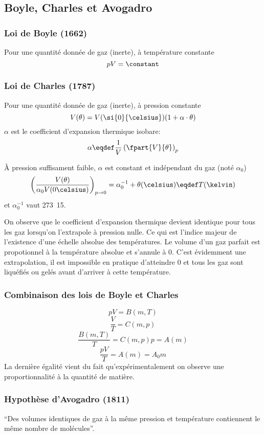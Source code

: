 \subsection{Boyle, Charles et Avogadro}
\subsubsection{Loi de Boyle (1662)}
Pour une quantité donnée de gaz (inerte), à température constante
\[ pV = \constant \]

\subsubsection{Loi de Charles (1787)}
Pour une quantité donnée de gaz (inerte), à pression constante
\[ V(\theta) = V(\si{0}{\celsius})(1 + \alpha \cdot \theta) \]
$\alpha$ est le coefficient d'expansion thermique isobare:
\[ \alpha \eqdef
\frac{1}{V}\left(\fpart{V}{\theta}\right)_p \]

À pression suffisament faible,
$\alpha$ est constant et indépendant du gaz (noté $\alpha_0$)
\[ \left(\frac{V(\theta)}{\alpha_0 V(0\celsius)}\right)_{p\rightarrow 0} =
\alpha_0^{-1}+\theta(\celsius) \eqdef T(\kelvin) \]
et $\alpha_0^{-1}$ vaut \si{273.15}{\celsius}.

On observe que le coefficient d'expansion thermique devient identique
pour tous les gaz lorsqu'on l'extrapole à pression nulle.
Ce qui est l'indice majeur de l'existence
d'une échelle absolue des températures.
Le volume d'un gaz parfait est propotionnel à la température absolue et
s'annule à \si{0}{\kelvin}.
C'est évidemment une extrapolation, il est impossible en pratique d'atteindre
\si{0}{\kelvin} et tous les gaz sont liquéfiés ou
gelés avant d'arriver à cette température.

\subsubsection{Combinaison des lois de Boyle et Charles}
\[ pV = B(m,T) \]
\[ \frac{V}{T} = C(m,p) \]
\[ \frac{B(m,T)}{T} = C(m,p)p = A(m) \]
\[ \frac{pV}{T} = A(m) = A_0m \]
La dernière égalité vient du fait qu'expérimentalement on observe
une proportionnalité à la quantité de matière.

\subsubsection{Hypothèse d'Avogadro (1811)}
``Des volumes identiques de gaz à la même pression et
température contiennent le même nombre de molécules''.

